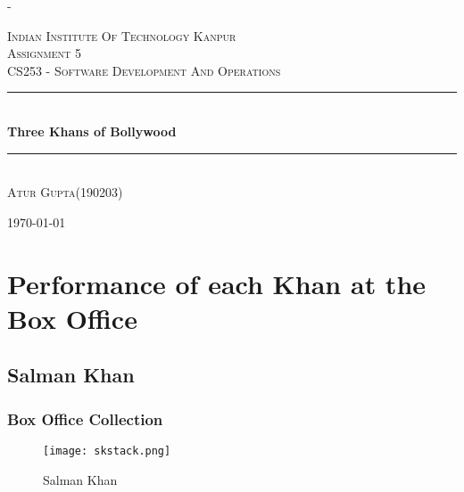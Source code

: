 \documentclass[12pt]{article}
\begin{document}


\begin{titlepage} 
	\newcommand{\HRule}{\rule{\linewidth}{0.5mm}} 
	
	\center 
	
	
-
	
	\textsc{\LARGE Indian Institute Of Technology Kanpur}\\[1.5cm] %
	
	\textsc{\Large Assignment 5}\\[0.5cm] %
	
	\textsc{\Large CS253 - Software Development And Operations}\\[0.5cm] %
	


	\HRule\\[0.4cm]
	
	{\huge\bfseries Three Khans of Bollywood}\\[0.4cm] %
	
	\HRule\\[1.5cm]
	
	\large
			\textsc{Atur Gupta(190203)}\\
	
	
    \vfill\vfill\vfill %
	
	{\large\today} %
	
	\vfill %
	
\end{titlepage}


\section{Performance of each Khan at the Box Office}

\subsection{Salman Khan}

\subsubsection{Box Office Collection}

\begin{figure}[h]
    \texttt{[image: skstack.png]}
    \caption{Salman Khan}
    \label{fig:BOC}
\end{figure}
\end{document}
